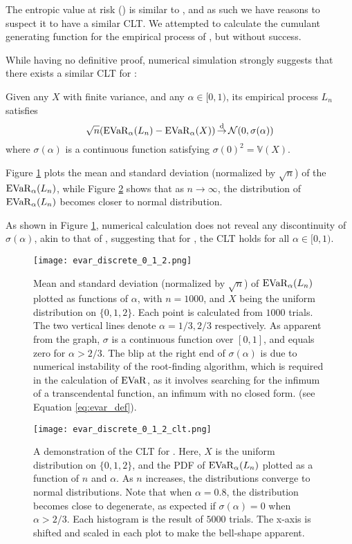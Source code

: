 The entropic value at risk (\evar) is similar to \cvar, and as such we have reasons to suspect it to have a similar CLT. We attempted to calculate the cumulant generating function for the empirical process of \evar, but without success. 


While having no definitive proof, numerical simulation strongly suggests that there exists a similar CLT for \evar:
\begin{conj}\label{conj:clt_evar}
Given any $X$ with finite variance, and any $\alpha\in [0, 1)$, its empirical process $L_n$ satisfies
\begin{equation}
	\sqrt{n}(\operatorname{EVaR}_\alpha(L_n) - \operatorname{EVaR}_\alpha(X)) \operatorname*{\stackrel{\text {d}}{\to}} \mathcal{N}(0, \sigma(\alpha))
\end{equation}
where $\sigma(\alpha)$ is a continuous function satisfying $\sigma(0)^2 =\mathbb{V}(X)$. 
\end{conj}

Figure \ref{fig:evar_discrete_0_1_2} plots the mean and standard deviation (normalized by $\sqrt{n}$) of the $\operatorname{EVaR}_\alpha(L_n)$, while Figure \ref{fig:evar_discrete_0_1_2_clt} shows that as $n\to \infty$, the distribution of $\operatorname{EVaR}_\alpha(L_n)$ becomes closer to normal distribution.

As shown in Figure \ref{fig:evar_discrete_0_1_2}, numerical calculation does not reveal any discontinuity of $\sigma(\alpha)$, akin to that of \cvar, suggesting that for \evar, the CLT holds for all $\alpha\in[0, 1)$.

\begin{figure}
	\centering
	\texttt{[image: evar\_discrete\_0\_1\_2.png]}
	\caption{Mean and standard deviation (normalized by $\sqrt n$) of $\operatorname{EVaR}_\alpha(L_n)$ plotted as functions of $\alpha$, with $n=1000$, and $X$ being the uniform distribution on $\{0, 1, 2\}$. Each point is calculated from $1000$ trials. The two vertical lines denote $\alpha = 1/3, 2/3$ respectively. As apparent from the graph, $\sigma$ is a continuous function over $[0, 1]$, and equals zero for $\alpha > 2/3$. The blip at the right end of $\sigma(\alpha)$ is due to numerical instability of the root-finding algorithm, which is required in the calculation of $\operatorname{EVaR}$, as it involves searching for the infimum of a transcendental function, an infimum with no closed form. (see Equation \ref{eq:evar_def}).}
	\label{fig:evar_discrete_0_1_2}
\end{figure}

\begin{figure}
	\centering
	\texttt{[image: evar\_discrete\_0\_1\_2\_clt.png]}
	\caption{A demonstration of the CLT for \evar. Here, $X$ is the uniform distribution on $\{0, 1, 2\}$, and the PDF of $\operatorname{EVaR}_\alpha (L_n)$ plotted as a function of $n$ and $\alpha$. As $n$ increases, the distributions converge to normal distributions. Note that when $\alpha = 0.8$, the distribution becomes close to degenerate, as expected if $\sigma(\alpha) = 0$ when $\alpha > 2/3$. 
	Each histogram is the result of $5000$ trials. The x-axis is shifted and scaled in each plot to make the bell-shape apparent.}
	\label{fig:evar_discrete_0_1_2_clt}
\end{figure}

